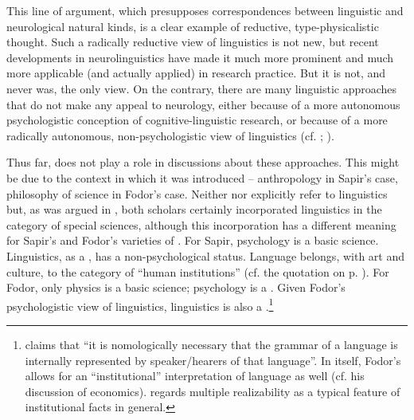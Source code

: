 \documentclass[output=paper]{langscibook}
\begin{document}
This line of argument, which presupposes correspondences between linguistic and neurological natural kinds, is a clear example of reductive, type-physicalistic thought. Such a radically reductive view of linguistics is not new, but recent developments in neurolinguistics have made it much more prominent and much more applicable (and actually applied) in research practice. But it is not, and never was, the only view. On the contrary, there are many linguistic approaches that do not make any appeal to neurology, either because of a more autonomous psychologistic conception of cognitive-linguistic research, or because of a more radically autonomous, non-psychologistic view of linguistics (cf. \citealt{Botha1992}; \citealt{Elffers2014}).

\largerpage
Thus far,  does not play a role in discussions about these approaches. This might be due to the context in which it was introduced -- anthropology in Sapir's case, philosophy of science in Fodor's case. Neither \citet{Sapir1917} nor \citet{Fodor1974} explicitly refer to linguistics but, as was argued in , both scholars certainly incorporated linguistics in the category of special sciences, although this incorporation has a different meaning for Sapir's and Fodor's varieties of . For Sapir, psychology is a basic science. Linguistics, as a , has a non-psychological status. Language belongs, with art and culture, to the category of ``human institutions'' (cf. the quotation on p. \pageref{q:elffers:huminst}). For Fodor, only physics is a basic science; psychology is a . Given Fodor's psychologistic view of linguistics, linguistics is also a .\footnote{\citet[149]{Fodor1985} claims that ``it is nomologically necessary that the grammar of a language is internally represented by speaker/hearers of that language''. In itself, Fodor's  allows for an ``institutional'' interpretation of language as well (cf. his discussion of economics). \citet[422--423]{Jones2004} regards multiple realizability as a typical feature of institutional facts in general.\label{fn:elffers:nomologically}}
\end{document}

